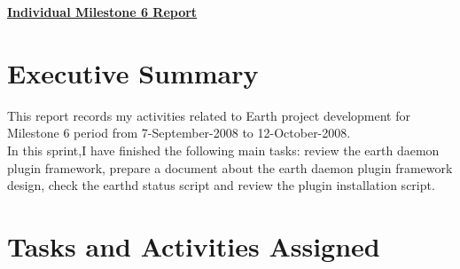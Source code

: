 \documentclass{article}
\begin{document}
\pagestyle{headings}

\begin{center}
{\LARGE\textbf{\underline{{Individual Milestone 6 Report}}}}
\end{center}

\section*{Executive Summary}
This report records my activities related to Earth project development for Milestone 6 period from 7-September-2008 to 12-October-2008.\\
In this sprint,I have finished the following main tasks: review the earth daemon plugin framework, prepare a document about the earth daemon plugin framework design, check the earthd status script and review the plugin installation script.      

\section*{Tasks and Activities Assigned}
\end{document}
